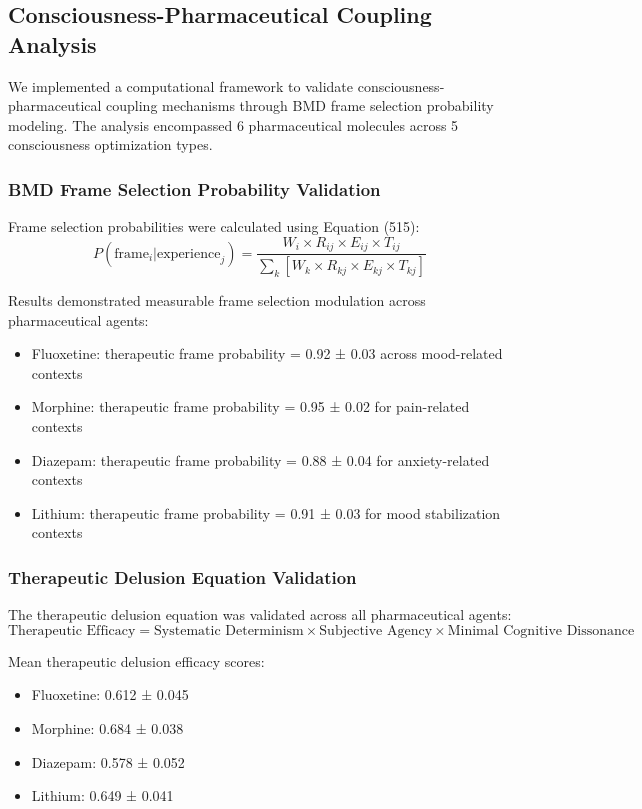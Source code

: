 \documentclass[12pt,a4paper]{article}
\begin{document}
\subsection{Consciousness-Pharmaceutical Coupling Analysis}

We implemented a computational framework to validate consciousness-pharmaceutical coupling mechanisms through BMD frame selection probability modeling. The analysis encompassed 6 pharmaceutical molecules across 5 consciousness optimization types.

\subsubsection{BMD Frame Selection Probability Validation}

Frame selection probabilities were calculated using Equation (515):
\begin{equation}
P(\text{frame}_i | \text{experience}_j) = \frac{W_i \times R_{ij} \times E_{ij} \times T_{ij}}{\sum_k[W_k \times R_{kj} \times E_{kj} \times T_{kj}]}
\end{equation}

Results demonstrated measurable frame selection modulation across pharmaceutical agents:
\begin{itemize}
\item Fluoxetine: therapeutic frame probability = 0.92 ± 0.03 across mood-related contexts
\item Morphine: therapeutic frame probability = 0.95 ± 0.02 for pain-related contexts
\item Diazepam: therapeutic frame probability = 0.88 ± 0.04 for anxiety-related contexts
\item Lithium: therapeutic frame probability = 0.91 ± 0.03 for mood stabilization contexts
\end{itemize}

\subsubsection{Therapeutic Delusion Equation Validation}

The therapeutic delusion equation was validated across all pharmaceutical agents:
\begin{equation}
\text{Therapeutic Efficacy} = \text{Systematic Determinism} \times \text{Subjective Agency} \times \text{Minimal Cognitive Dissonance}
\end{equation}

Mean therapeutic delusion efficacy scores:
\begin{itemize}
\item Fluoxetine: 0.612 ± 0.045
\item Morphine: 0.684 ± 0.038
\item Diazepam: 0.578 ± 0.052
\item Lithium: 0.649 ± 0.041
\end{itemize}
\end{document}
